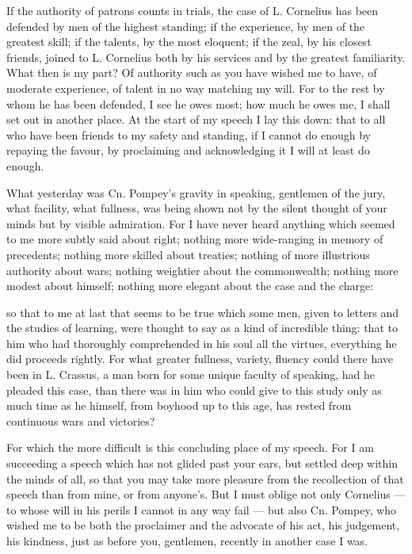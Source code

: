
 If the authority of patrons counts in trials, the case of L. Cornelius has been defended by men of the highest standing; if the experience, by men of the greatest skill; if the talents, by the most eloquent; if the zeal, by his closest friends, joined to L. Cornelius both by his services and by the greatest familiarity. What then is my part? Of authority such as you have wished me to have, of moderate experience, of talent in no way matching my will. For to the rest by whom he has been defended, I see he owes most; how much he owes me, I shall set out in another place. At the start of my speech I lay this down: that to all who have been friends to my safety and standing, if I cannot do enough by repaying the favour, by proclaiming and acknowledging it I will at least do enough.

 What yesterday was Cn. Pompey's gravity in speaking, gentlemen of the jury, what facility, what fullness, was being shown not by the silent thought of your minds but by visible admiration. For I have never heard anything which seemed to me more subtly said about right; nothing more wide-ranging in memory of precedents; nothing more skilled about treaties; nothing of more illustrious authority about wars; nothing weightier about the commonwealth; nothing more modest about himself; nothing more elegant about the case and the charge:

 so that to me at last that seems to be true which some men, given to letters and the studies of learning, were thought to say as a kind of incredible thing: that to him who had thoroughly comprehended in his soul all the virtues, everything he did proceeds rightly. For what greater fullness, variety, fluency could there have been in L. Crassus, a man born for some unique faculty of speaking, had he pleaded this case, than there was in him who could give to this study only as much time as he himself, from boyhood up to this age, has rested from continuous wars and victories?

 For which the more difficult is this concluding place of my speech. For I am succeeding a speech which has not glided past your ears, but settled deep within the minds of all, so that you may take more pleasure from the recollection of that speech than from mine, or from anyone's. But I must oblige not only Cornelius --- to whose will in his perils I cannot in any way fail --- but also Cn. Pompey, who wished me to be both the proclaimer and the advocate of his act, his judgement, his kindness, just as before you, gentlemen, recently in another case I was.

